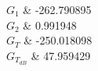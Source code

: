 $G_1$	&	-262.790895\\\hline
$G_2$	&	0.991948\\\hline
$G_T$	&	-250.018098\\\hline
$G_{T_{dB}}$	&	47.959429\\\hline

